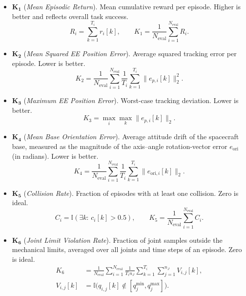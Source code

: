 \documentclass{ieeeaccess}
\begin{document}
\begin{itemize}
  \item $\boldsymbol{K_1}$ (\emph{Mean Episodic Return}). Mean cumulative reward per episode. Higher is better and
  reflects overall task success.
  \begin{equation*}
  R_i=\sum_{k=1}^{T_i} r_i[k], \qquad K_1=\frac{1}{N_{\mathrm{eval}}}\sum_{i=1}^{N_{\mathrm{eval}}} R_i.
  \end{equation*}

  \item $\boldsymbol{K_2}$ (\emph{Mean Squared EE Position Error}). Average squared tracking error per episode. Lower
  is better.
  \begin{equation*}
  K_2=\frac{1}{N_{\mathrm{eval}}}\sum_{i=1}^{N_{\mathrm{eval}}}\frac{1}{T_i}\sum_{k=1}^{T_i}\|e_{p,i}[k]\|_2^2.
  \end{equation*}

  \item $\boldsymbol{K_3}$ (\emph{Maximum EE Position Error}). Worst-case tracking deviation. Lower is better.
  \begin{equation*}
  K_3=\max_{i}\max_{k}\|e_{p,i}[k]\|_2.
  \end{equation*}

  \item $\boldsymbol{K_4}$ (\emph{Mean Base Orientation Error}). Average attitude drift of the spacecraft base, measured
  as the magnitude of the axis--angle rotation-vector error $e_{\mathrm{ori}}$ (in radians). Lower is better.
  \begin{equation*}
  K_4=\frac{1}{N_{\mathrm{eval}}}\sum_{i=1}^{N_{\mathrm{eval}}}\frac{1}{T_i}\sum_{k=1}^{T_i}\|e_{\mathrm{ori},i}[k]\|_2.
  \end{equation*}

  \item $\boldsymbol{K_5}$ (\emph{Collision Rate}). Fraction of episodes with at least one collision. Zero is
  ideal.
  \begin{equation*}
  C_i=\mathbb{I}(\exists k:\,c_i[k]>0.5), \qquad K_5=\frac{1}{N_{\mathrm{eval}}}\sum_{i=1}^{N_{\mathrm{eval}}} C_i.
  \end{equation*}

  \item $\boldsymbol{K_6}$ (\emph{Joint Limit Violation Rate}). Fraction of joint samples outside the
  mechanical limits, averaged over all joints and time steps of an episode. Zero is ideal.
  \begin{equation*}
  \begin{aligned}
  K_6 &= \frac{1}{N_{\mathrm{eval}}}\sum_{i=1}^{N_{\mathrm{eval}}}\frac{1}{T_i n_J}\sum_{k=1}^{T_i}\sum_{j=1}^{n_J}
  V_{i,j}[k],\\
  V_{i,j}[k] &= \mathbb{I}\!\big(q_{i,j}[k]\notin[q_j^{\min},q_j^{\max}]\big).
  \end{aligned}
  \end{equation*}


\end{itemize}
\end{document}
